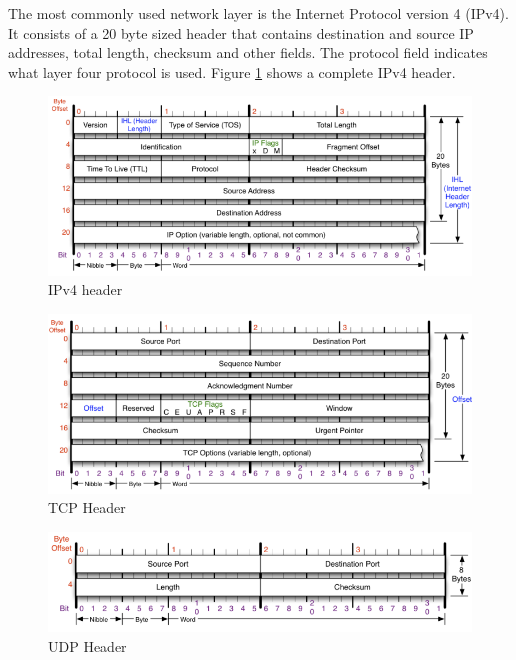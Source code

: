 The most commonly used network layer is the Internet Protocol version 4 (IPv4).
It consists of a 20 byte sized header that contains destination and source IP
addresses, total length, checksum and other fields. The protocol field indicates
what layer four protocol is used. Figure \ref{fig:ip} shows a complete IPv4
header.

\clearpage
\begin{figure}[tb!]
    \centering
    \includegraphics[width=\textwidth]{images/theory/ip.png}
    \caption{IPv4 header \cite{ip}}
    \label{fig:ip}
\end{figure}
\begin{figure}[tb!]
    \centering
    \includegraphics[width=\textwidth]{images/theory/tcp.png}
    \caption{TCP Header \cite{tcpudp}}
    \label{fig:tcp}
\end{figure}
\begin{figure}[tb!]
    \centering
    \includegraphics[width=\textwidth]{images/theory/udp.png}
    \caption{UDP Header \cite{tcpudp}}
    \label{fig:udp}
\end{figure}
\clearpage

